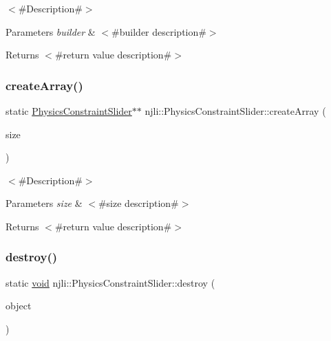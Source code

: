 $<$\#\+Description\#$>$


\begin{DoxyParams}{Parameters}
{\em builder} & $<$\#builder description\#$>$\\
\hline
\end{DoxyParams}
\begin{DoxyReturn}{Returns}
$<$\#return value description\#$>$ 
\end{DoxyReturn}
\mbox{\label{classnjli_1_1_physics_constraint_slider_a450adff89ca4821c15d5b5e038261e94}} 
\subsubsection{\texorpdfstring{create\+Array()}{createArray()}}
{\footnotesize\ttfamily static \mbox{\hyperlink{classnjli_1_1_physics_constraint_slider}{Physics\+Constraint\+Slider}}$\ast$$\ast$ njli\+::\+Physics\+Constraint\+Slider\+::create\+Array (\begin{DoxyParamCaption}\item[{const \mbox{\hyperlink{_util_8h_a10e94b422ef0c20dcdec20d31a1f5049}{u32}}}]{size }\end{DoxyParamCaption})\hspace{0.3cm}{\ttfamily [static]}}

$<$\#\+Description\#$>$


\begin{DoxyParams}{Parameters}
{\em size} & $<$\#size description\#$>$\\
\hline
\end{DoxyParams}
\begin{DoxyReturn}{Returns}
$<$\#return value description\#$>$ 
\end{DoxyReturn}
\mbox{\label{classnjli_1_1_physics_constraint_slider_ac746bf16e379f1142f987816d8b8fab2}} 
\subsubsection{\texorpdfstring{destroy()}{destroy()}}
{\footnotesize\ttfamily static \mbox{\hyperlink{_thread_8h_af1e856da2e658414cb2456cb6f7ebc66}{void}} njli\+::\+Physics\+Constraint\+Slider\+::destroy (\begin{DoxyParamCaption}\item[{\mbox{\hyperlink{classnjli_1_1_physics_constraint_slider}{Physics\+Constraint\+Slider}} $\ast$}]{object }\end{DoxyParamCaption})\hspace{0.3cm}{\ttfamily [static]}}

